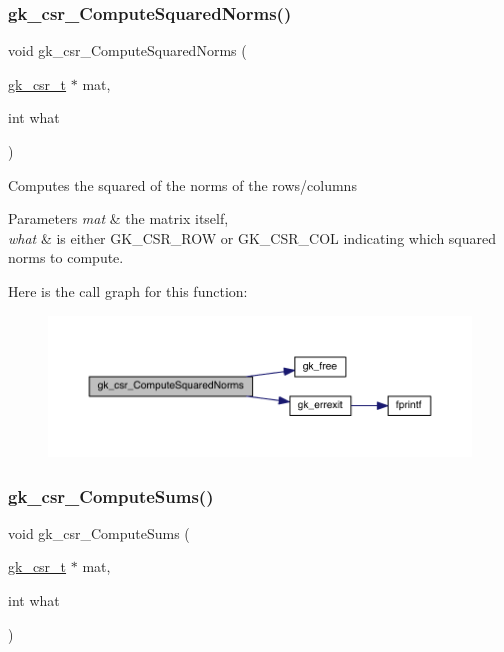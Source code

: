 \subsubsection{\texorpdfstring{gk\+\_\+csr\+\_\+\+Compute\+Squared\+Norms()}{gk\_csr\_ComputeSquaredNorms()}}
{\footnotesize\ttfamily void gk\+\_\+csr\+\_\+\+Compute\+Squared\+Norms (\begin{DoxyParamCaption}\item[{\hyperlink{a00634}{gk\+\_\+csr\+\_\+t} $\ast$}]{mat,  }\item[{int}]{what }\end{DoxyParamCaption})}

Computes the squared of the norms of the rows/columns 
\begin{DoxyParams}{Parameters}
{\em mat} & the matrix itself, \\
\hline
{\em what} & is either G\+K\+\_\+\+C\+S\+R\+\_\+\+R\+OW or G\+K\+\_\+\+C\+S\+R\+\_\+\+C\+OL indicating which squared norms to compute. \\
\hline
\end{DoxyParams}
Here is the call graph for this function\+:\nopagebreak
\begin{figure}[H]
\begin{center}
\leavevmode
\includegraphics[width=350pt]{a00077_adb5c0f634607e45daaf7098399f1da0e_cgraph}
\end{center}
\end{figure}
\mbox{\label{a00077_a3cc2a64b0ead1b41ad824bc9401f1b84}} 
\subsubsection{\texorpdfstring{gk\+\_\+csr\+\_\+\+Compute\+Sums()}{gk\_csr\_ComputeSums()}}
{\footnotesize\ttfamily void gk\+\_\+csr\+\_\+\+Compute\+Sums (\begin{DoxyParamCaption}\item[{\hyperlink{a00634}{gk\+\_\+csr\+\_\+t} $\ast$}]{mat,  }\item[{int}]{what }\end{DoxyParamCaption})}

